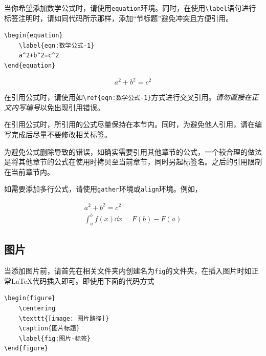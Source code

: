 当你希望添加数学公式时，请使用\verb|equation|环境。同时，在使用\verb|\label|语句进行标签注明时，请如同代码所示那样，添加“节标题”避免冲突且方便引用。

\begin{lstlisting}[frame=line]
\begin{equation}
    \label{eqn:数学公式-1}
    a^2+b^2=c^2
\end{equation}
\end{lstlisting}

\begin{equation}
    \label{eqn:数学公式-1}
    a^2+b^2=c^2
\end{equation}

在引用公式时，请使用如\verb|\ref{eqn:数学公式-1}|方式进行交叉引用。\emph{请勿直接在正文内写编号}以免出现引用错误。

\begin{attention}
    在引用公式时，所引用的公式尽量保持在本节内。同时，为避免他人引用，请在编写完成后尽量不要修改相关标签。

    为避免公式删除导致的错误，如确实需要引用其他章节的公式，一个较合理的做法是将其他章节的公式在使用时拷贝至当前章节，同时另起标签名。之后的引用限制在当前章节内。
\end{attention}

如需要添加多行公式，请使用\verb|gather|环境或\verb|align|环境。例如，

\begin{gather}
    a^2+b^2=c^2\label{eqn:数学公式-2}\\
    \int_a^bf(x)\dd{x}=F(b)-F(a)\label{eqn:数学公式-3}
\end{gather}

\subsection{图片}\label{subsec:关于如何使用LaTeX编写模板-图片}

当添加图片前，请首先在相关文件夹内创建名为\verb|fig|的文件夹，在插入图片时如正常\LaTeX 代码插入即可。即使用下面的代码方式

\begin{lstlisting}[frame=line]
\begin{figure}
    \centering
    \texttt{[image: 图片路径]}
    \caption{图片标题}
    \label{fig:图片-标签}
\end{figure}
\end{lstlisting}

